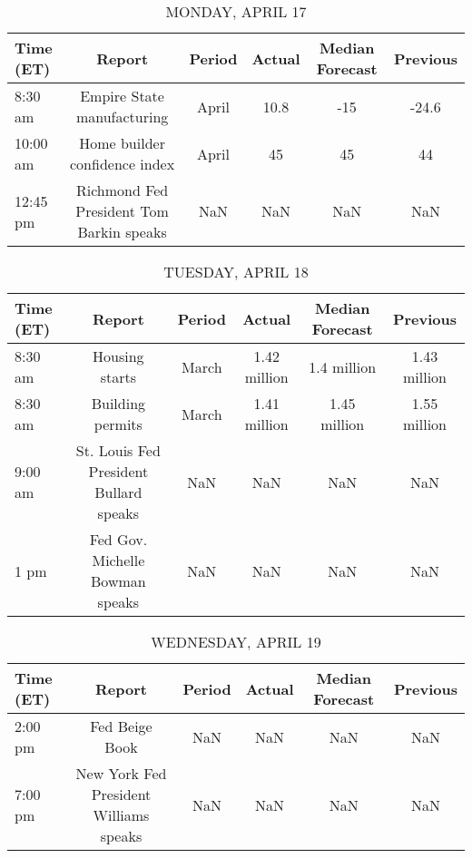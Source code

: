 \documentclass{article}%
\begin{document}
%
\normalsize%


\begin{table}[htbp]%
\caption{MONDAY, APRIL 17}%
\centering%
\begin{adjustbox}{width=1\textwidth}%
\begin{tabular}{lccccc}
\toprule
Time (ET) &                                   Report & Period & Actual & Median Forecast & Previous \\
\midrule
  8:30 am &               Empire State manufacturing &  April &   10.8 &             -15 &    -24.6 \\
 10:00 am &            Home builder confidence index &  April &     45 &              45 &       44 \\
 12:45 pm & Richmond Fed President Tom Barkin speaks &    NaN &    NaN &             NaN &      NaN \\
\bottomrule
\end{tabular}
%
\end{adjustbox}%
\end{table}

%


\begin{table}[htbp]%
\caption{TUESDAY, APRIL 18}%
\centering%
\begin{adjustbox}{width=1\textwidth}%
\begin{tabular}{lccccc}
\toprule
Time (ET) &                                 Report & Period &       Actual & Median Forecast &     Previous \\
\midrule
  8:30 am &                         Housing starts &  March & 1.42 million &     1.4 million & 1.43 million \\
  8:30 am &                       Building permits &  March & 1.41 million &    1.45 million & 1.55 million \\
  9:00 am & St. Louis Fed President Bullard speaks &    NaN &          NaN &             NaN &          NaN \\
     1 pm &        Fed Gov. Michelle Bowman speaks &    NaN &          NaN &             NaN &          NaN \\
\bottomrule
\end{tabular}
%
\end{adjustbox}%
\end{table}

%


\begin{table}[htbp]%
\caption{WEDNESDAY, APRIL 19}%
\centering%
\begin{adjustbox}{width=1\textwidth}%
\begin{tabular}{lccccc}
\toprule
Time (ET) &                                 Report & Period & Actual & Median Forecast & Previous \\
\midrule
  2:00 pm &                         Fed Beige Book &    NaN &    NaN &             NaN &      NaN \\
  7:00 pm & New York Fed President Williams speaks &    NaN &    NaN &             NaN &      NaN \\
\bottomrule
\end{tabular}
%
\end{adjustbox}%
\end{table}
\end{document}
